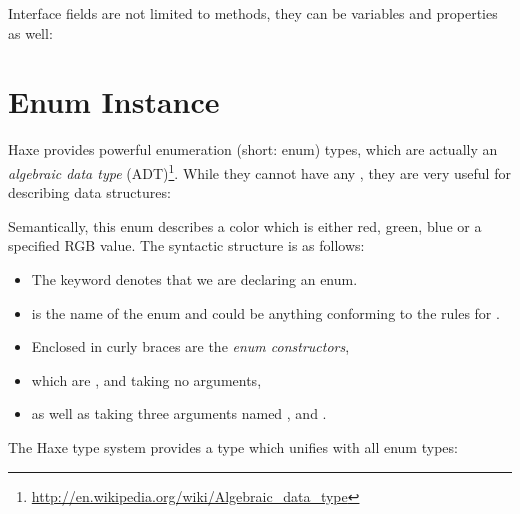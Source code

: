 \documentclass{haxe}
\begin{document}
Interface fields are not limited to methods, they can be variables and properties as well:




\section{Enum Instance}
\label{types-enum-instance}

Haxe provides powerful enumeration (short: enum) types, which are actually an \emph{algebraic data type} (ADT)\footnote{\url{http://en.wikipedia.org/wiki/Algebraic_data_type}}. While they cannot have any , they are very useful for describing data structures:

Semantically, this enum describes a color which is either red, green, blue or a specified RGB value. The syntactic structure is as follows:
\begin{itemize}
	\item The keyword  denotes that we are declaring an enum.
	\item {} is the name of the enum and could be anything conforming to the rules for .
	\item Enclosed in curly braces \expr{$\left\{\right\}$} are the \emph{enum constructors},
	\item which are ,  and  taking no arguments,
	\item as well as  taking three  arguments named ,  and .
\end{itemize}
The Haxe type system provides a type which unifies with all enum types:


\end{document}

